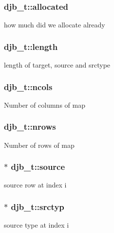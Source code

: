 \subsubsection[{allocated}]{ djb\+\_\+t\+::allocated}\label{structdjb__t_a3e8d52a148a10973f49bb0fd23abb8c9}
how much did we allocate already \hypertarget{structdjb__t_a0abdd28a245ac9c2366c2a8a64b86ee4}{}
\subsubsection[{length}]{ djb\+\_\+t\+::length}\label{structdjb__t_a0abdd28a245ac9c2366c2a8a64b86ee4}
length of target, source and srctype \hypertarget{structdjb__t_a2183c4b607aa77362167d63bcd14d030}{}
\subsubsection[{ncols}]{ djb\+\_\+t\+::ncols}\label{structdjb__t_a2183c4b607aa77362167d63bcd14d030}
Number of columns of map \hypertarget{structdjb__t_a2b1cd5b49a1d4b029d680281d21b1186}{}
\subsubsection[{nrows}]{ djb\+\_\+t\+::nrows}\label{structdjb__t_a2b1cd5b49a1d4b029d680281d21b1186}
Number of rows of map \hypertarget{structdjb__t_ac0aa133b6b2e76c42fc19356f77f0585}{}
\subsubsection[{source}]{$\ast$ djb\+\_\+t\+::source}\label{structdjb__t_ac0aa133b6b2e76c42fc19356f77f0585}
source row at index i \hypertarget{structdjb__t_aadb2d133e2306fcb6ed8492935d1cc7b}{}
\subsubsection[{srctyp}]{$\ast$ djb\+\_\+t\+::srctyp}\label{structdjb__t_aadb2d133e2306fcb6ed8492935d1cc7b}
source type at index i \hypertarget{structdjb__t_adf9374605be2bbe0d61acc5ab00f75d6}{}
